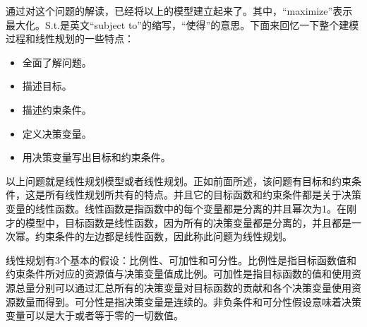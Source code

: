 \begin{frame}{\subsecname}
通过对这个问题的解读，已经将以上的模型建立起来了。其中，“maximize”表示最大化。S.t.是英文“subject to”的缩写，“使得”的意思。下面来回忆一下整个建模过程和线性规划的一些特点：
\begin{itemize}
    \item 全面了解问题。
     \item 描述目标。
\item 描述约束条件。
\item 定义决策变量。
\item 用决策变量写出目标和约束条件。
\end{itemize}
以上问题就是线性规划模型或者线性规划。正如前面所述，该问题有目标和约束条件，这是所有线性规划所共有的特点。并且它的目标函数和约束条件都是关于决策变量的线性函数。线性函数是指函数中的每个变量都是分离的并且幂次为1。在刚才的模型中，目标函数是线性函数，因为所有的决策变量都是分离的，并且都是一次幂。约束条件的左边都是线性函数，因此称此问题为线性规划。

线性规划有3个基本的假设：比例性、可加性和可分性。比例性是指目标函数值和约束条件所对应的资源值与决策变量值成比例。可加性是指目标函数的值和使用资源总量分别可以通过汇总所有的决策变量对目标函数的贡献和各个决策变量使用资源数量而得到。可分性是指决策变量是连续的。非负条件和可分性假设意味着决策变量可以是大于或者等于零的一切数值。

\end{frame}


